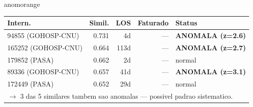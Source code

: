 \documentclass[a4paper,10pt]{article}
\begin{document}
\begin{anomalycard}[Internacao 116947 | GHO-BRADESCO | ALTO (z=3.28)]{anomorange}
\begin{tabular}{l r r r l}\toprule\textbf{Intern.} & \textbf{Simil.} & \textbf{LOS} & \textbf{Faturado} & \textbf{Status} \\\midrule
94855 (GOHOSP-CNU) & 0.731 & 4d & --- & \textcolor{anomred}{\textbf{ANOMALA (z=2.6)}} \\
165252 (GOHOSP-CNU) & 0.664 & 113d & --- & \textcolor{anomred}{\textbf{ANOMALA (z=2.7)}} \\
179852 (PASA) & 0.662 & 2d & --- & \textcolor{jcubeblue}{normal} \\
89336 (GOHOSP-CNU) & 0.657 & 41d & --- & \textcolor{anomred}{\textbf{ANOMALA (z=3.1)}} \\
172449 (PASA) & 0.652 & 29d & --- & \textcolor{jcubeblue}{normal} \\
\multicolumn{5}{l}{\textcolor{anomred}{\small $\rightarrow$ 3 das 5 similares tambem sao anomalas --- possivel padrao sistematico.}} \\
\bottomrule\end{tabular}


\end{anomalycard}

\newpage
\end{document}

